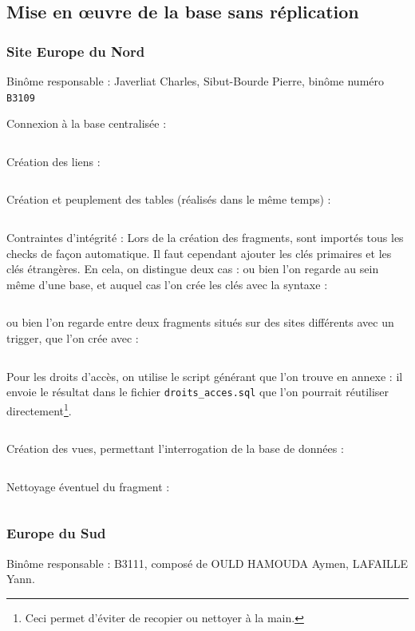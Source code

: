 \documentclass[10pt,a4paper]{article}
\theoremstyle{plain}
\begin{document}
\newpage
\subsection{Mise en \oe uvre de la base sans réplication}
\subsubsection{Site Europe du Nord}
Binôme responsable : Javerliat Charles, Sibut-Bourde Pierre, binôme numéro \verb|B3109|

Connexion à la base centralisée :
\inputminted{sql}{EUN_connexion_db_ryori.sql}
\newpage

Création des liens :
\inputminted{sql}{INSA-DB12-EuropeNord-creation-liens-db.sql}
\newpage 

Création et peuplement des tables (réalisés dans le même temps) :\\
\inputminted{sql}{INSA-DB12-EuropeNord-fragmentation.sql}
\newpage 

Contraintes d'intégrité : Lors de la création des fragments, sont importés tous les checks de façon automatique. Il faut cependant ajouter les clés primaires et les clés étrangères. En cela, on distingue deux cas : ou bien l'on regarde au sein même d'une base, et auquel cas l'on crée les clés avec la syntaxe :\\
\inputminted{sql}{INSA-DB12-EuropeNord-contraintes.sql}
\newpage

ou bien l'on regarde entre deux fragments situés sur des sites différents avec un trigger, que l'on crée avec :
\inputminted{sql}{INSA-DB12-EuropeNord-trigger.sql}
\newpage

Pour les droits d'accès, on utilise le script générant que l'on trouve en annexe : il envoie le résultat dans le fichier \verb|droits_acces.sql| que l'on pourrait réutiliser directement\footnote{Ceci permet d'éviter de recopier ou nettoyer à la main.}.
\inputminted{sql}{INSA-DB12-droits-acces.sql}
\newpage

Création des vues, permettant l'interrogation de la base de données :
\inputminted{sql}{INSA-DB12-EuropeNord-vues.sql}
\newpage 

Nettoyage éventuel du fragment :
\inputminted{sql}{INSA-DB12-EuropeNord-drop.sql}
\newpage

\subsubsection{Europe du Sud}
Binôme responsable : B3111, composé de OULD HAMOUDA Aymen, LAFAILLE Yann.\\
\end{document}
